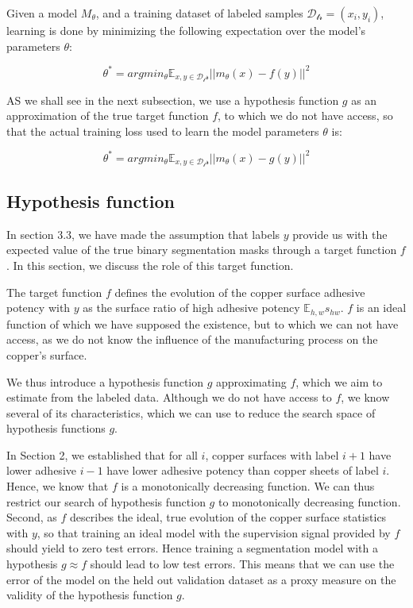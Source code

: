 \documentclass[10pt,twocolumn,letterpaper]{article}
\begin{document}
Given a model $M_{\theta}$, and a training dataset of labeled samples $\mathcal{D_{tr}}={(x_i, y_i)}$,
learning is done by minimizing the following expectation over the model's parameters $\theta$:

$$\theta^* = argmin_{\theta} \mathbb{E}_{x,y \in \mathcal{D_tr}} ||m_{\theta}(x) - f(y) ||^2 $$

AS we shall see in the next subsection, we use a hypothesis function $g$ 
as an approximation of the true target function $f$, to which we do not have access, 
so that the actual training loss used to learn the model parameters $\theta$ is:

$$\theta^* = argmin_{\theta} \mathbb{E}_{x,y \in \mathcal{D_tr}} ||m_{\theta}(x) - g(y) ||^2 $$

\subsection{Hypothesis function}

In section 3.3, we have made the assumption 
that labels $y$ provide us with the expected value 
of the true binary segmentation masks through a target function $f$.
In this section, we discuss the role of this target function.

The target function $f$ defines the evolution of the copper surface adhesive potency with $y$ as the surface ratio of high adhesive potency $\mathbb{E}_{h,w}s_{hw}$.
$f$ is an ideal function of which we have supposed the existence, 
but to which we can not have access,
as we do not know the influence of the manufacturing process on the copper's surface.

We thus introduce a hypothesis function $g$ approximating $f$,
which we aim to estimate from the labeled data.
Although we do not have access to $f$, we know several of its characteristics,
which we can use to reduce the search space of hypothesis functions $g$.

In Section 2, we established that for all $i$, copper surfaces with label $i+1$ have lower 
adhesive $i-1$ have lower adhesive potency than copper sheets of label $i$.
Hence, we know that $f$ is a monotonically decreasing function.
We can thus restrict our search of hypothesis function $g$ to monotonically decreasing function.
Second, as $f$ describes the ideal, true evolution of the copper surface statistics with $y$,
so that training an ideal model with the supervision signal provided by $f$ should yield to zero test errors.
Hence training a segmentation model with a hypothesis $g \approx f$ should lead to low test errors.
This means that we can use the error of the model on the held out validation dataset as a proxy measure on
the validity of the hypothesis function $g$.
\end{document}
